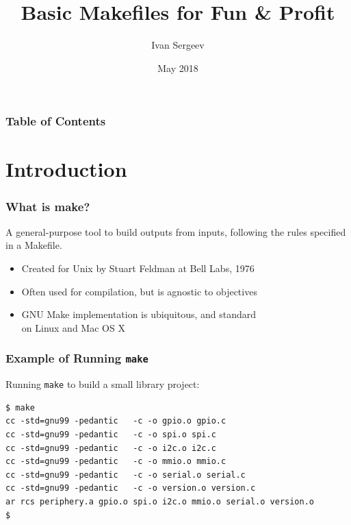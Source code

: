\documentclass[xcolor=dvipsnames,t,compress]{beamer}
\title{Basic Makefiles for Fun \& Profit}
\author{Ivan Sergeev}
\institute{\normalsize\texttt{git clone https://github.com/vsergeev/basic-makefiles.git}}
\date{May 2018}
\begin{document}
\frame{\titlepage}

\begin{frame}
\frametitle{Table of Contents}
\tableofcontents
\end{frame}


\section{Introduction}

\begin{frame}
\frametitle{What is make?}
A general-purpose tool to build outputs from inputs, following the rules specified in a Makefile.

\begin{itemize}[<+->]
\item Created for Unix by Stuart Feldman at Bell Labs, 1976
\item Often used for compilation, but is agnostic to objectives
\item GNU Make implementation is ubiquitous, and standard \\ on Linux and Mac OS X
\end{itemize}
\end{frame}

\begin{frame}[fragile]
\frametitle{Example of Running \texttt{make}}
Running \texttt{make} to build a small library project:
\\
\begin{verbatim}
$ make
cc -std=gnu99 -pedantic   -c -o gpio.o gpio.c
cc -std=gnu99 -pedantic   -c -o spi.o spi.c
cc -std=gnu99 -pedantic   -c -o i2c.o i2c.c
cc -std=gnu99 -pedantic   -c -o mmio.o mmio.c
cc -std=gnu99 -pedantic   -c -o serial.o serial.c
cc -std=gnu99 -pedantic   -c -o version.o version.c
ar rcs periphery.a gpio.o spi.o i2c.o mmio.o serial.o version.o
$ 
\end{verbatim}
\end{frame}
\end{document}
